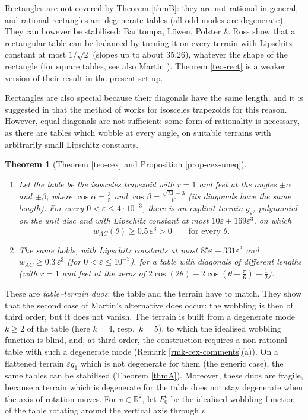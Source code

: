\documentclass[a4paper,11pt,twoside,leqno]{article}
\newtheorem{teoalph}{Theorem}
\newcommand{\eps}[0]{\varepsilon}
\newcommand{\rr}[0]{\ensuremath{\mathbb{R}}}
\numberwithin{equation}{section}
\begin{document}
Rectangles are not covered by Theorem \ref{thmB}: they are not rational in general, and rational rectangles are degenerate tables (all odd modes are degenerate). They can however be stabilised: Baritompa, L\"owen, Polster \& Ross \cite[Theorem 2]{BLPR} show that a rectangular table can be balanced by turning it on every terrain with Lipschitz constant at most $1/\sqrt{2}$ (slopes up to about $35.26$\textdegree{}), whatever the shape of the rectangle (for square tables, see also Martin \cite{Mar}). Theorem \ref{teo-rect} is a weaker version of their result in the present set-up.

Rectangles are also special because their diagonals have the same length, and it is suggested in \cite[\S{}4]{Mar} that the method of \cite{BLPR} works for isosceles trapezoids for this reason. However, equal diagonals are not sufficient: some form of rationality is necessary, as there are tables which wobble at every angle, on suitable terrains with arbitrarily small Lipschitz constants.

\begin{teoalph}[Theorem \ref{teo-cex} and Proposition \ref{prop-cex-uneq}]\label{thmC}
\begin{enumerate}\renewcommand{\theenumi}{\bfseries (\alph{enumi})}
 \item Let the table be the isosceles trapezoid with $r = 1$ and feet at the angles $\pm\alpha$ and $\pm\beta$, where $\cos\alpha = \frac{3}{5}$ and $\cos\beta = \frac{\sqrt{23}-3}{10}$ (its diagonals have the same length). For every $0 < \eps \leq 4 \cdot 10^{-3}$, there is an explicit terrain $g_\eps$, polynomial on the unit disc and with Lipschitz constant at most $10\eps + 169\eps^3$, on which
 \[
 w_{AC}(\theta) \geq 0.5\, \eps^3 > 0 \qquad \text{for every } \theta.
 \]
 \item The same holds, with Lipschitz constants at most $85\eps + 331\eps^3$ and $w_{AC} \geq 0.3\,\eps^3$ (for $0 < \eps \leq 10^{-3}$), for a table with diagonals of different lengths (with $r = 1$ and feet at the zeros of $2\cos(2\theta) - 2\cos(\theta + \frac{\pi}{6}) + \frac{1}{2}$).
\end{enumerate}
\end{teoalph}

These are \emph{table--terrain duos}: the table and the terrain have to match. They show that the second case of Martin's alternative does occur: the wobbling is then of third order, but it does not vanish. The terrain is built from a degenerate mode $k \geq 2$ of the table (here $k = 4$, resp.\ $k = 5$), to which the idealised wobbling function is blind, and, at third order, the construction requires a non-rational table with such a degenerate mode (Remark \ref{rmk-cex-comments}(a)). On a flattened terrain $\eps g_1$ which is not degenerate for them (the generic case), the same tables can be stabilised (Theorem \ref{thmA}). Moreover, these duos are fragile, because a terrain which is degenerate for the table does not stay degenerate when the axis of rotation moves. For $v \in \rr^2$, let $F_0^v$ be the idealised wobbling function of the table rotating around the vertical axis through $v$.
\end{document}
